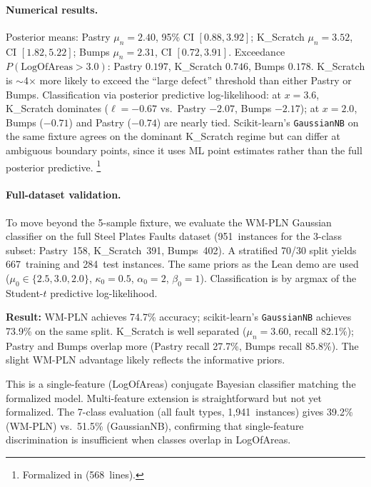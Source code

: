 \documentclass[11pt,openany]{report}
\begin{document}
\paragraph{Numerical results.}
Posterior means: Pastry $\mu_n = 2.40$, 95\% CI $[0.88, 3.92]$;
K\_Scratch $\mu_n = 3.52$, CI $[1.82, 5.22]$;
Bumps $\mu_n = 2.31$, CI $[0.72, 3.91]$.
Exceedance $P(\mathrm{LogOfAreas} > 3.0)$: Pastry $0.197$,
K\_Scratch $\mathbf{0.746}$, Bumps $0.178$.  K\_Scratch is
$\sim$4$\times$ more likely to exceed the ``large defect'' threshold
than either Pastry or Bumps.
Classification via posterior predictive log-likelihood:
at $x = 3.6$, K\_Scratch dominates ($\ell = -0.67$ vs.\ Pastry
$-2.07$, Bumps $-2.17$); at $x = 2.0$, Bumps ($-0.71$) and Pastry
($-0.74$) are nearly tied.  Scikit-learn's \texttt{GaussianNB} on
the same fixture agrees on the dominant K\_Scratch regime but can
differ at ambiguous boundary points, since it uses ML point estimates
rather than the full posterior predictive.%
\footnote{Formalized in  (568~lines).}

\paragraph{Full-dataset validation.}
\label{sec:steel-full}
To move beyond the 5-sample fixture, we evaluate the WM-PLN Gaussian
classifier on the full Steel Plates Faults dataset (951~instances for
the 3-class subset: Pastry~158, K\_Scratch~391, Bumps~402).
A stratified 70/30 split yields 667~training and 284~test instances.
The same priors as the Lean demo are used ($\mu_0 \in \{2.5, 3.0, 2.0\}$,
$\kappa_0 = 0.5$, $\alpha_0 = 2$, $\beta_0 = 1$).
Classification is by argmax of the Student-$t$ predictive log-likelihood.

\textbf{Result:} WM-PLN achieves 74.7\% accuracy; scikit-learn's
\texttt{GaussianNB} achieves 73.9\% on the same split.
K\_Scratch is well separated ($\mu_n = 3.60$, recall 82.1\%);
Pastry and Bumps overlap more (Pastry recall 27.7\%, Bumps recall 85.8\%).
The slight WM-PLN advantage likely reflects the informative priors.

This is a single-feature (LogOfAreas) conjugate Bayesian classifier
matching the formalized model.  Multi-feature extension is straightforward
but not yet formalized.  The 7-class evaluation (all fault types, 1,941~instances)
gives 39.2\% (WM-PLN) vs.\ 51.5\% (GaussianNB), confirming that single-feature
discrimination is insufficient when classes overlap in LogOfAreas.
\end{document}
